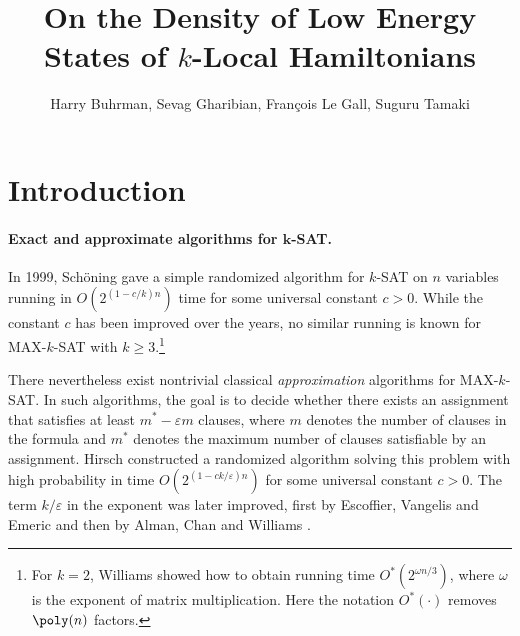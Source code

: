 \documentclass[11pt,a4paper]{article}
\theoremstyle{plain}
\theoremstyle{definition}
\begin{document}


\title{On the Density of Low Energy States of $k$-Local Hamiltonians}
\date{}
\author{Harry Buhrman, Sevag Gharibian, Fran{\c c}ois Le Gall, Suguru Tamaki}

\maketitle
\thispagestyle{empty}

\section{Introduction}
\paragraph{Exact and approximate algorithms for $\boldsymbol{k}$-SAT.}
In 1999, Sch\"oning \cite{SchoningFOCS99} gave a simple randomized algorithm for $k$-SAT on $n$ variables running in $O(2^{(1-c/k)n})$ time for some universal constant $c>0$. While the constant $c$ has been improved over the years, no similar running is known for MAX-$k$-SAT with $k\ge 3$.\footnote{For $k=2$, Williams \cite{WilliamsICALP04} showed how to obtain running time $O^\ast(2^{\omega n/3})$, where $\omega$ is the exponent of matrix multiplication. Here the notation $O^\ast(\cdot)$ removes $\poly(n)$ factors.}

There nevertheless exist nontrivial classical \emph{approximation} algorithms for MAX-$k$-SAT. In such algorithms, the goal is to decide whether there exists an assignment that satisfies at least $m^\ast-\varepsilon m$ clauses, where $m$ denotes the number of clauses in the formula and $m^\ast$ denotes the maximum number of clauses satisfiable by an assignment. Hirsch \cite{Hirsch03} constructed a randomized algorithm solving this problem with high probability in time $O\left(2^{(1-ck/\varepsilon)n}\right)$ for some universal constant $c>0$. The term $k/\varepsilon$ in the exponent was later improved, first by Escoffier, Vangelis and Emeric \cite{Escoffier+14} and then by Alman, Chan and Williams \cite{Alman+SODA20}. 
\end{document}
